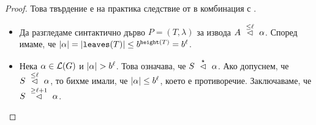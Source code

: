 \begin{proof}


  
  Това твърдение е на практика следствие от  в комбинация с .
  \begin{itemize}
  \item
    Да разгледаме синтактично дърво $P = (T,\lambda)$ за извода $A ~\stackrel{{\leq\ell}}{\lhd}~ \alpha$.
    Според  имаме, че $\vert{\alpha}\vert = \vert{\texttt{leaves}(T)}\vert\leq b^{\texttt{height}(T)} = b^{\ell}$.
  \item
    Нека $\alpha \in \mathcal{L}(G)$ и $\vert{\alpha}\vert > b^\ell$. Това означава, че $S ~\stackrel{{\star}}{\lhd}~ \alpha$.
    Ако допуснем, че $S ~\stackrel{{\leq \ell}}{\lhd}~ \alpha$, то бихме имали, че $\vert{\alpha}\vert \leq b^\ell$, което е противоречие.
    Заключаваме, че $S ~\stackrel{{\geq \ell+1}}{\lhd}~ \alpha$.
  \end{itemize}
\end{proof}

